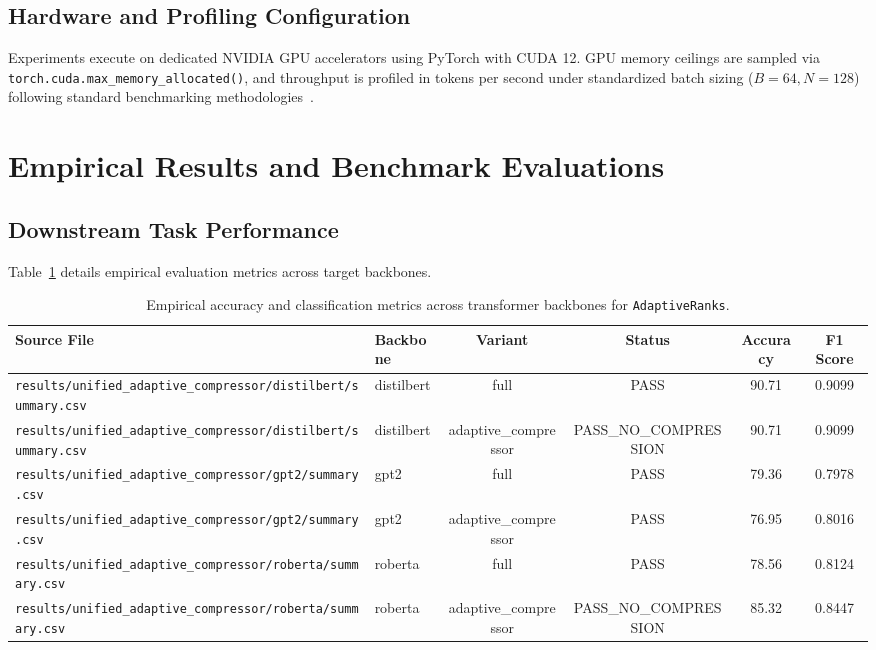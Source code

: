 \subsection{Hardware and Profiling Configuration}
Experiments execute on dedicated NVIDIA GPU accelerators using PyTorch with CUDA 12. GPU memory ceilings are sampled via \texttt{torch.cuda.max\_memory\_allocated()}, and throughput is profiled in tokens per second under standardized batch sizing ($B=64, N=128$) following standard benchmarking methodologies~\citep{kwon2023pagedattention,horowitz2014,strubell2019}.


\section{Empirical Results and Benchmark Evaluations}

\subsection{Downstream Task Performance}
Table~\ref{tab:results_acc_adaptivecompressor} details empirical evaluation metrics across target backbones.

\begin{table}[t]
\centering
\small
\begin{tabular}{llcccc}
\toprule
\textbf{Source File} & \textbf{Backbone} & \textbf{Variant} & \textbf{Status} & \textbf{Accuracy} & \textbf{F1 Score} \\
\midrule
\texttt{results/unified\_adaptive\_compressor/distilbert/summary.csv} & distilbert & full & PASS & 90.71 & 0.9099 \\
\texttt{results/unified\_adaptive\_compressor/distilbert/summary.csv} & distilbert & adaptive\_compressor & PASS\_NO\_COMPRESSION & 90.71 & 0.9099 \\
\texttt{results/unified\_adaptive\_compressor/gpt2/summary.csv} & gpt2 & full & PASS & 79.36 & 0.7978 \\
\texttt{results/unified\_adaptive\_compressor/gpt2/summary.csv} & gpt2 & adaptive\_compressor & PASS & 76.95 & 0.8016 \\
\texttt{results/unified\_adaptive\_compressor/roberta/summary.csv} & roberta & full & PASS & 78.56 & 0.8124 \\
\texttt{results/unified\_adaptive\_compressor/roberta/summary.csv} & roberta & adaptive\_compressor & PASS\_NO\_COMPRESSION & 85.32 & 0.8447 \\
\bottomrule
\end{tabular}
\caption{Empirical accuracy and classification metrics across transformer backbones for \texttt{AdaptiveRanks}.}
\label{tab:results_acc_adaptivecompressor}
\end{table}

